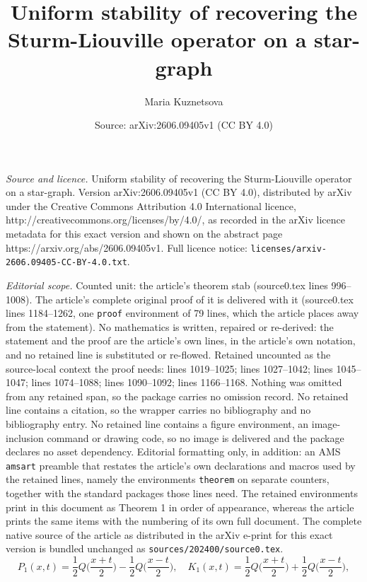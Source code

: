 \documentclass[10pt,a4paper]{amsart}
\title{Uniform stability of recovering the Sturm-Liouville operator on a star-graph}
\author{Maria Kuznetsova}
\date{Source: arXiv:2606.09405v1 (CC BY 4.0)}
\begin{document}
\maketitle

\noindent\emph{Source and licence.} Uniform stability of recovering the Sturm-Liouville operator on a star-graph. Version arXiv:2606.09405v1 (CC BY 4.0), distributed by arXiv under the Creative Commons Attribution 4.0 International licence, http://creativecommons.org/licenses/by/4.0/, as recorded in the arXiv licence metadata for this exact version and shown on the abstract page https://arxiv.org/abs/2606.09405v1. Full licence notice: \texttt{licenses/arxiv-2606.09405-CC-BY-4.0.txt}.\par\smallskip

\noindent\textit{Editorial scope.} Counted unit: the article's theorem stab (source0.tex lines 996--1008). The article's complete original proof of it is delivered with it (source0.tex lines 1184--1262, one \texttt{proof} environment of 79 lines, which the article places away from the statement). No mathematics is written, repaired or re-derived: the statement and the proof are the article's own lines, in the article's own notation, and no retained line is substituted or re-flowed.  Retained uncounted as the source-local context the proof needs: lines 1019--1025; lines 1027--1042; lines 1045--1047; lines 1074--1088; lines 1090--1092; lines 1166--1168.  Nothing was omitted from any retained span, so the package carries no omission record.  No retained line contains a citation, so the wrapper carries no bibliography and no bibliography entry.  No retained line contains a figure environment, an image-inclusion command or drawing code, so no image is delivered and the package declares no asset dependency.  Editorial formatting only, in addition: an AMS \texttt{amsart} preamble that restates the article's own declarations and macros used by the retained lines, namely the environments \texttt{theorem} on separate counters, together with the standard packages those lines need.  The retained environments print in this document as Theorem 1 in order of appearance, whereas the article prints the same items with the numbering of its own full document.  The complete native source of the article as distributed in the arXiv e-print for this exact version is bundled unchanged as \texttt{sources/202400/source0.tex}.
\begin{equation} \label{K_1}
P_1(x,t) = \frac{1}{2}Q\Big(\frac{x+t}{2}\Big) -
\frac{1}{2}Q\Big(\frac{x-t}{2}\Big),
\quad
K_1(x,t)=\frac{1}{2}Q\Big(\frac{x+t}{2}\Big)+\frac{1}{2}
Q\Big(\frac{x-t}{2}\Big),
\end{equation}
\end{document}
